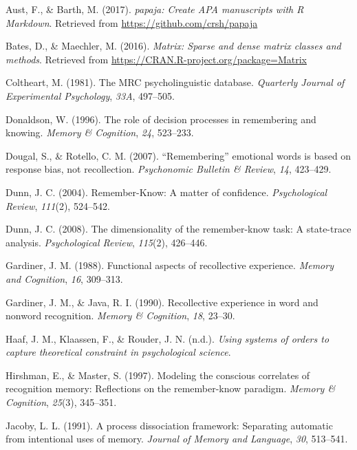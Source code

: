 \documentclass[english,,man]{apa6}
\begin{document}
\leavevmode\hypertarget{ref-R-papaja}{}%
Aust, F., \& Barth, M. (2017). \emph{papaja: Create APA manuscripts with R Markdown}. Retrieved from \url{https://github.com/crsh/papaja}

\leavevmode\hypertarget{ref-R-Matrix}{}%
Bates, D., \& Maechler, M. (2016). \emph{Matrix: Sparse and dense matrix classes and methods}. Retrieved from \url{https://CRAN.R-project.org/package=Matrix}

\leavevmode\hypertarget{ref-Coltheart:1981}{}%
Coltheart, M. (1981). The MRC psycholinguistic database. \emph{Quarterly Journal of Experimental Psychology}, \emph{33A}, 497--505.

\leavevmode\hypertarget{ref-Donaldson:1996}{}%
Donaldson, W. (1996). The role of decision processes in remembering and knowing. \emph{Memory \& Cognition}, \emph{24}, 523--233.

\leavevmode\hypertarget{ref-Dougal:Rotello:2007}{}%
Dougal, S., \& Rotello, C. M. (2007). ``Remembering'' emotional words is based on response bias, not recollection. \emph{Psychonomic Bulletin \& Review}, \emph{14}, 423--429.

\leavevmode\hypertarget{ref-Dunn:2004}{}%
Dunn, J. C. (2004). Remember-Know: A matter of confidence. \emph{Psychological Review}, \emph{111}(2), 524--542.

\leavevmode\hypertarget{ref-Dunn:2008}{}%
Dunn, J. C. (2008). The dimensionality of the remember-know task: A state-trace analysis. \emph{Psychological Review}, \emph{115}(2), 426--446.

\leavevmode\hypertarget{ref-Gardiner:1988}{}%
Gardiner, J. M. (1988). Functional aspects of recollective experience. \emph{Memory and Cognition}, \emph{16}, 309--313.

\leavevmode\hypertarget{ref-Gardiner:Java:1990}{}%
Gardiner, J. M., \& Java, R. I. (1990). Recollective experience in word and nonword recognition. \emph{Memory \& Cognition}, \emph{18}, 23--30.

\leavevmode\hypertarget{ref-Haaf:etal:2018}{}%
Haaf, J. M., Klaassen, F., \& Rouder, J. N. (n.d.). \emph{Using systems of orders to capture theoretical constraint in psychological science}.

\leavevmode\hypertarget{ref-Hirshman:Master:1997}{}%
Hirshman, E., \& Master, S. (1997). Modeling the conscious correlates of recognition memory: Reflections on the remember-know paradigm. \emph{Memory \& Cognition}, \emph{25}(3), 345--351.

\leavevmode\hypertarget{ref-Jacoby:1991}{}%
Jacoby, L. L. (1991). A process dissociation framework: Separating automatic from intentional uses of memory. \emph{Journal of Memory and Language}, \emph{30}, 513--541.
\end{document}
